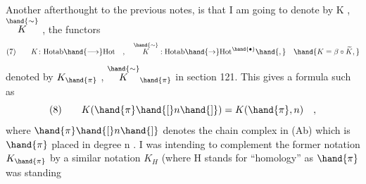 Another afterthought to the previous notes, is that I am going to
denote by K , $\overset{\hand{\sim}}{K}$ , the functors
\[ (7) \qquad K\colon \mathrm{Hotab} \hand{\longrightarrow} \mathrm{Hot} \quad , \quad \overset{\hand{\sim}}{K} : \mathrm{Hotab} \hand{\to} \mathrm{Hot}^{\hand{\bullet}} \hand{,} \quad \hand{K=\beta\circ\widetilde{K} ,} \]
denoted by $K_{\hand{\pi}}$ , $\overset{\hand{\sim}}{K}_{\hand{\pi}}$ in section 121. This gives a formula such as
\[ (8) \qquad K(\hand{\pi}\hand{[}n\hand{]}) = K(\hand{\pi},n) \quad , \]
where $\hand{\pi}\hand{[}n\hand{]}$ denotes the chain complex in (Ab) which is $\hand{\pi}$ placed in degree
n . I was intending to complement the  former notation $K_{\hand{\pi}}$ by a
similar notation $K_H$ (where H stands for ``homology''\hand{,} as $\hand{\pi}$ was standing


